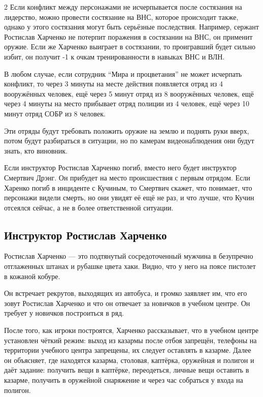 \documentclass[twoside]{article}
\begin{document}
\begin{multicols}{2}
Если конфликт между персонажами не исчерпывается после состязания на
лидерство, можно провести состязание на ВНС, которое происходит также,
однако у этого состязания могут быть серьёзные последствия. Например,
сержант Ростислав Харченко не потерпит поражения в состязании на ВНС, он
применит оружие. Если же Харченко выиграет в состязании, то проигравший
будет сильно избит, он получит -1 к очкам тренированности в
навыках ВНС и ВЛН.

В любом случае, если сотрудник \enquote{Мира и процветания} не может исчерпать
конфликт, то через 3 минуты на месте действия появляется отряд из 4
вооружённых человек, ещё через 5 минут отряд из 8 вооружённых человек,
ещё через 4 минуты на место прибывает отряд полиции из 4 человек, ещё
через 10 минут отряд СОБР из 8 человек.

Эти отряды будут требовать положить оружие на землю и поднять руки
вверх, потом будут разбираться в ситуации, но по камерам видеонаблюдения
они будут знать, кто виновник.

Если инструктор Ростислав Харченко погиб, вместо него будет инструктор
Смертвич Дрэнг. Он прибудет на место происшествия с первым отрядом. Если
Харенко погиб в инциденте с Кучиным, то Смертвич скажет, что понимает,
что персонажи видели смерть, но они увидят её ещё не раз, и что лучше,
что Кучин отсеялся сейчас, а не в более ответственной ситуации.

\subsection{Инструктор Ростислав Харченко}\label{instructor-harchenko}

Ростислав Харченко --- это подтянутый сосредоточенный мужчина в
безупречно отглаженных штанах и рубашке цвета хаки. Видно, что у него на
поясе пистолет в кожаной кобуре.

Он встречает рекрутов, выходящих из автобуса, и громко заявляет им, что
его зовут Ростислав Харченко и что он отвечает за новичков в учебном
центре. Он требует у новичков построиться в ряд.

После того, как игроки построятся, Харченко рассказывает, что в учебном
центре установлен чёткий режим: выход из казармы после отбоя запрещён,
телефоны на территории учебного центра запрещены, их следует оставлять в
казарме. Далее он объясняет, где находятся казарма, столовая, каптёрка,
оружейная и полигон и даёт задание: получить вещи в каптёрке,
переодеться, личные вещи оставить в казарме, получить в оружейной
снаряжение и через час собраться у входа на полигон.


\end{multicols}
\end{document}
